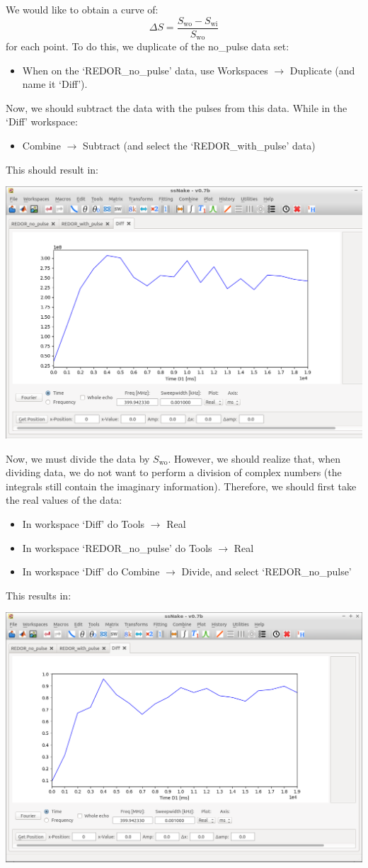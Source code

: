 \documentclass[11pt,a4paper]{article}
\begin{document}
We would like to obtain a curve of:
\begin{equation*}
  \Delta S = \frac{S_\text{wo} - S_\text{wi}}{S_\text{wo}}
\end{equation*}
for each point.
To do this, we duplicate of the no\_pulse data set:
\begin{itemize}
\item When on the `REDOR\_no\_pulse' data, use Workspaces $\longrightarrow$ Duplicate (and name it `Diff').
\end{itemize}
Now, we should subtract the data with the pulses from this data.
While in the `Diff' workspace:
\begin{itemize}
\item Combine $\longrightarrow$ Subtract (and select the `REDOR\_with\_pulse' data)
\end{itemize}
This should result in:
\begin{center}
\includegraphics[width=0.8\linewidth]{Figs/Fig4.png}
\end{center}
Now, we must divide the data by $S_\text{wo}$.
However, we should realize that, when dividing data, we do not want to perform a division of complex numbers (the integrals still contain the imaginary information).
Therefore, we should first take the real values of the data:
\begin{itemize}
\item In workspace `Diff' do Tools $\longrightarrow$ Real
\item In workspace `REDOR\_no\_pulse' do Tools $\longrightarrow$ Real
\item In workspace `Diff' do  Combine $\longrightarrow$ Divide, and select `REDOR\_no\_pulse'
\end{itemize}
This results in:
\begin{center}
\includegraphics[width=0.8\linewidth]{Figs/Fig5.png}
\end{center}
\end{document}
